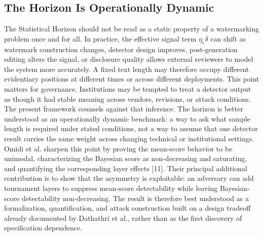 \documentclass[11pt]{article}
\begin{document}
\subsection{The Horizon Is Operationally Dynamic}
The Statistical Horizon should not be read as a static property of a watermarking
problem once and for all. In practice, the effective signal term $\eta_e\delta$ can
shift as watermark construction changes, detector design improves, post-generation
editing alters the signal, or disclosure quality allows external reviewers to model
the system more accurately. A fixed text length may therefore occupy different
evidentiary positions at different times or across different deployments.
This point matters for governance. Institutions may be tempted to treat a detector
output as though it had stable meaning across vendors, revisions, or attack
conditions. The present framework counsels against that inference. The horizon is
better understood as an operationally dynamic benchmark: a way to ask what sample
length is required under stated conditions, not a way to assume that one detector
result carries the same weight across changing technical or institutional settings.
Omidi et al. sharpen this point by proving the mean-score behavior to be unimodal,
characterizing the Bayesian score as non-decreasing and saturating, and quantifying
the corresponding layer effects [11]. Their principal additional contribution is
to show that the asymmetry is exploitable: an adversary can add tournament layers
to suppress mean-score detectability while leaving Bayesian-score detectability
non-decreasing. The result is therefore best understood as a formalization,
quantification, and attack construction built on a design tradeoff already
documented by Dathathri et al., rather than as the first discovery of specification
dependence.
\end{document}
